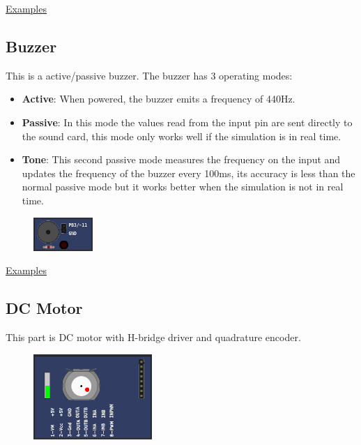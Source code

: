 \href{https://lcgamboa.github.io/picsimlab_examples/parts_7_Segments_Display_(Decoder).html}{Examples}

\subsection{Buzzer}

This is a active/passive buzzer.
The buzzer has 3 operating modes: 
\begin{itemize}
\item \textbf{Active}: When powered, the buzzer emits a frequency of 440Hz. 
\item \textbf{Passive}: In this mode the values read from the input pin are sent directly to the sound card, this mode only works well if the simulation is in real time. 
\item \textbf{Tone}: This second passive mode measures the frequency on the input and updates the frequency of the buzzer every 100ms, its accuracy is less than the normal passive mode but it works better when the simulation is not in real time. 
\end{itemize}

\begin{figure}[H]
\center
\includegraphics[width=0.2\textwidth]{img/part_buzzer.png} 
\end{figure} 

\href{https://lcgamboa.github.io/picsimlab_examples/parts_Buzzer.html}{Examples}


\subsection{DC Motor}

This part is DC motor with H-bridge driver and quadrature encoder. 

\begin{figure}[H]
\center
\includegraphics[width=0.4\textwidth]{img/part_dcmotor.png} 
\end{figure} 

